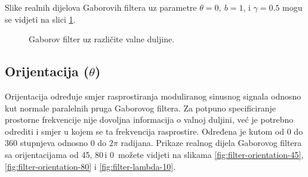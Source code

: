 \documentclass{article}
\begin{document}
Slike realnih dijelova Gaborovih filtera uz parametre $\theta = 0,\: b
= 1$, i $\gamma = 0.5$ mogu se vidjeti na slici \ref{fig:filter-wavelengths}.

\begin{figure}[h!tb]
\centering
{}
\hspace{50pt}
\caption{Gaborov filter uz različite valne duljine.}
\label{fig:filter-wavelengths}
\end{figure}



\subsection{Orijentacija ($\theta$)}
Orijentacija određuje smjer rasprostiranja moduliranog sinusnog signala odnosno
kut normale paralelnih pruga Gaborovog filtera. Za potpuno
specificiranje prostorne frekvencije nije dovoljna informacija o valnoj
duljini, već je potrebno odrediti i smjer u kojem se ta frekvencija
rasprostire. Određena je kutom od $0$ do $360$ stupnjeva odnosno $0$ do $2\pi$
radijana. Prikaze realnog dijela Gaborovog filtera sa orijentacijama od
45\textdegree, 80\textdegree\,i 0\textdegree\, možete vidjeti na slikama
\ref{fig:filter-orientation-45}, \ref{fig:filter-orientation-80} i \ref{fig:filter-lambda-10}.
\end{document}
